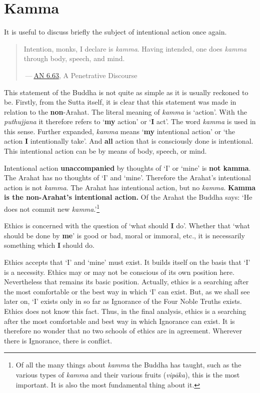 \chapter{Kamma}

It is useful to discuss briefly the subject of intentional action once again.

\begin{quote}
Intention, monks, I declare is \emph{kamma}. Having intended, one does \emph{kamma} through body, speech, and mind.

 --- \href{https://suttacentral.net/an6.63/en/thanissaro}{AN 6.63}, A Penetrative Discourse
\end{quote}

This statement of the Buddha is not quite as simple as it is usually reckoned to be. Firstly, from the Sutta itself, it is clear that this statement was made in relation to the \textbf{non}-Arahat. The literal meaning of \emph{kamma} is `action'. With the \emph{puthujjana} it therefore refers to `\textbf{my} action' or `\textbf{I} act'. The word \emph{kamma} is used in this sense. Further expanded, \emph{kamma} means `\textbf{my} intentional action' or `the action \textbf{I} intentionally take'. And \textbf{all} action that is consciously done is intentional. This intentional action can be by means of body, speech, or mind.

Intentional action \textbf{unaccompanied} by thoughts of `I' or `mine' is \textbf{not kamma}. The Arahat has no thoughts of `I' and `mine'. Therefore the Arahat's intentional action is not \emph{kamma}. The Arahat has intentional action, but no \emph{kamma}. \textbf{Kamma is the non-Arahat's intentional action.} Of the Arahat the Buddha says: `He does not commit new \emph{kamma}.'\footnote{Of all the many things about \emph{kamma} the Buddha has taught, such as the various types of \emph{kamma} and their various fruits (\emph{vipāka}), this is the most important. It is also the most fundamental thing about it.}

Ethics is concerned with the question of `what should \textbf{I} do'. Whether that `what should be done by \textbf{me}' is good or bad, moral or immoral, etc., it is necessarily something which \textbf{I} should do.

Ethics accepts that `I' and `mine' must exist. It builds itself on the basis that `I' is a necessity. Ethics may or may not be conscious of its own position here. Nevertheless that remains its basic position. Actually, ethics is a searching after the most comfortable or the best way in which `I' can exist. But, as we shall see later on, `I' exists only in so far as Ignorance of the Four Noble Truths exists. Ethics does not know this fact. Thus, in the final analysis, ethics is a searching after the most comfortable and best way in which Ignorance can exist. It is therefore no wonder that no two schools of ethics are in agreement. Wherever there is Ignorance, there is conflict.

